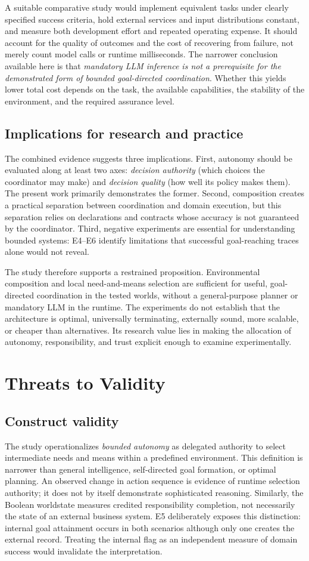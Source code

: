 \documentclass[11pt]{article}
\begin{document}
A suitable comparative study would implement equivalent tasks under clearly specified success criteria, hold external services and input distributions constant, and measure both development effort and repeated operating expense. It should account for the quality of outcomes and the cost of recovering from failure, not merely count model calls or runtime milliseconds. The narrower conclusion available here is that \emph{mandatory LLM inference is not a prerequisite for the demonstrated form of bounded goal-directed coordination}. Whether this yields lower total cost depends on the task, the available capabilities, the stability of the environment, and the required assurance level.

\subsection{Implications for research and practice}
The combined evidence suggests three implications. First, autonomy should be evaluated along at least two axes: \emph{decision authority} (which choices the coordinator may make) and \emph{decision quality} (how well its policy makes them). The present work primarily demonstrates the former. Second, composition creates a practical separation between coordination and domain execution, but this separation relies on declarations and contracts whose accuracy is not guaranteed by the coordinator. Third, negative experiments are essential for understanding bounded systems: E4--E6 identify limitations that successful goal-reaching traces alone would not reveal.

The study therefore supports a restrained proposition. Environmental composition and local need-and-means selection are sufficient for useful, goal-directed coordination in the tested worlds, without a general-purpose planner or mandatory LLM in the runtime. The experiments do not establish that the architecture is optimal, universally terminating, externally sound, more scalable, or cheaper than alternatives. Its research value lies in making the allocation of autonomy, responsibility, and trust explicit enough to examine experimentally.
\section{Threats to Validity}
\subsection{Construct validity}
The study operationalizes \emph{bounded autonomy} as delegated authority to select intermediate needs and means within a predefined environment. This definition is narrower than general intelligence, self-directed goal formation, or optimal planning. An observed change in action sequence is evidence of runtime selection authority; it does not by itself demonstrate sophisticated reasoning. Similarly, the Boolean worldstate measures credited responsibility completion, not necessarily the state of an external business system. E5 deliberately exposes this distinction: internal goal attainment occurs in both scenarios although only one creates the external record. Treating the internal flag as an independent measure of domain success would invalidate the interpretation.
\end{document}
